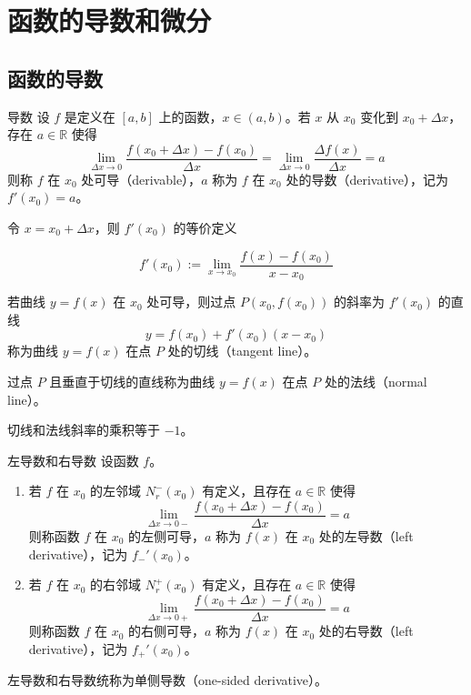 \chapter{函数的导数和微分}


\section{函数的导数}
\begin{definition}{导数}
    设 $f$ 是定义在 $[a, b]$ 上的函数，$x\in (a, b)$。若 $x$ 从 $x_0$ 变化到 $x_0 + \Delta x$，存在 $a\in \mathbb{R}$ 使得
    \[\lim_{\Delta x\to 0}\frac{f(x_0+\Delta x) - f(x_0)}{\Delta x} = \lim_{\Delta x\to 0}\frac{\Delta f(x)}{\Delta x} = a\]
    则称 $f$ 在 $x_0$ 处可导（derivable），$a$ 称为 $f$ 在 $x_0$ 处的导数（derivative），记为 $f'(x_0) = a$。
\end{definition}

令 $x = x_0 + \Delta x$，则 $f'(x_0)$ 的等价定义

\[f'(x_0) := \lim_{x\to x_0}\frac{f(x) - f(x_0)}{x - x_0}\]

\begin{definition}
    若曲线 $y = f(x)$ 在 $x_0$ 处可导，则过点 $P(x_0, f(x_0))$ 的斜率为 $f'(x_0)$ 的直线
    \[y = f(x_0) + f'(x_0)(x - x_0)\]
    称为曲线 $y = f(x)$ 在点 $P$ 处的切线（tangent line）。

    过点 $P$ 且垂直于切线的直线称为曲线 $y = f(x)$ 在点 $P$ 处的法线（normal line）。

    切线和法线斜率的乘积等于 $-1$。
\end{definition}


\begin{definition}{左导数和右导数}
    设函数 $f$。
    \begin{enumerate}
        \item 若 $f$ 在 $x_0$ 的左邻域 $N_r^-(x_0)$ 有定义，且存在 $a\in \mathbb{R}$ 使得
              \[\lim_{\Delta x\to 0-}\frac{f(x_0+\Delta x) - f(x_0)}{\Delta x} = a\]
              则称函数 $f$ 在 $x_0$ 的左侧可导，$a$ 称为 $f(x)$ 在 $x_0$ 处的左导数（left derivative），记为 $f_{-}'(x_0)$。
        \item 若 $f$ 在 $x_0$ 的右邻域 $N_r^+(x_0)$ 有定义，且存在 $a\in \mathbb{R}$ 使得
              \[\lim_{\Delta x\to 0+}\frac{f(x_0+\Delta x) - f(x_0)}{\Delta x} = a\]
              则称函数 $f$ 在 $x_0$ 的右侧可导，$a$ 称为 $f(x)$ 在 $x_0$ 处的右导数（left derivative），记为 $f_{+}'(x_0)$。
    \end{enumerate}
    左导数和右导数统称为单侧导数（one-sided derivative）。
\end{definition}

